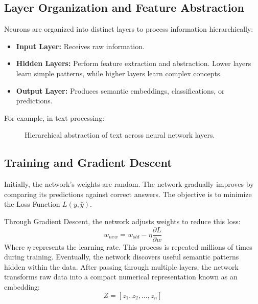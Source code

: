 \documentclass[10pt, conference]{IEEEtran}
\begin{document}
\subsection{\textbf{Layer Organization and Feature Abstraction}}
Neurons are organized into distinct layers to process information hierarchically:
\begin{itemize}
    \item \textbf{Input Layer:} Receives raw information.
    \item \textbf{Hidden Layers:} Perform feature extraction and abstraction. Lower layers learn simple patterns, while higher layers learn complex concepts.
    \item \textbf{Output Layer:} Produces semantic embeddings, classifications, or predictions.
\end{itemize}

For example, in text processing:
\begin{figure}[h]
\centering
{}
\caption{Hierarchical abstraction of text across neural network layers.}
\label{fig:layer_abstraction}
\end{figure}

\subsection{\textbf{Training and Gradient Descent}}
Initially, the network's weights are random. The network gradually improves by comparing its predictions against correct answers. The objective is to minimize the Loss Function $L(y, \hat{y})$.

Through Gradient Descent, the network adjusts weights to reduce this loss:
\begin{equation}
    w_{new} = w_{old} - \eta \frac{\partial L}{\partial w}
\end{equation}
Where $\eta$ represents the learning rate. This process is repeated millions of times during training. Eventually, the network discovers useful semantic patterns hidden within the data. After passing through multiple layers, the network transforms raw data into a compact numerical representation known as an embedding:
\begin{equation}
    Z = [z_1, z_2, \dots, z_n]
\end{equation}
\end{document}
